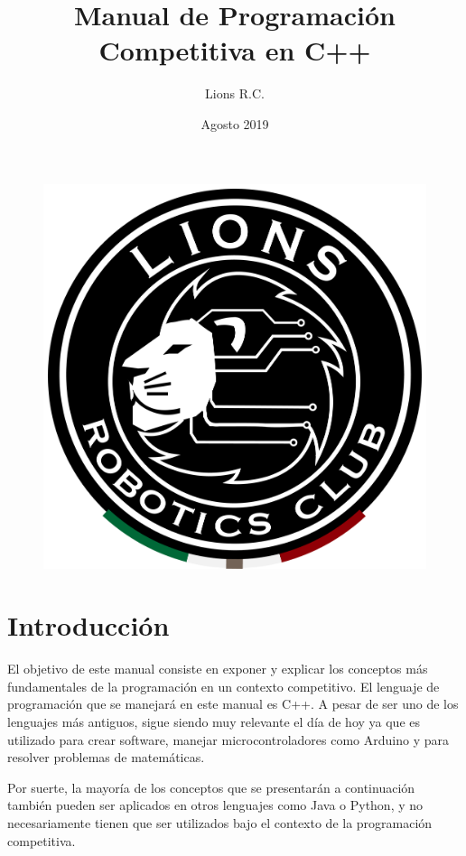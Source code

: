 \documentclass{article}
\title{Manual de Programación Competitiva en C++}
\author{Lions R.C.}
\date{Agosto 2019}
\begin{document}
\maketitle

\begin{figure}[H]
    \centering
    \includegraphics[width=0.2\paperwidth]{newblack}
\end{figure}

\tableofcontents

\section{Introducción}

El objetivo de este manual consiste en exponer y explicar los conceptos más fundamentales de la programación en un contexto competitivo. El lenguaje de programación que se manejará en este manual es C++. A pesar de ser uno de los lenguajes más antiguos, sigue siendo muy relevante el día de hoy ya que es utilizado para crear software, manejar microcontroladores como Arduino y para resolver problemas de matemáticas.

Por suerte, la mayoría de los conceptos que se presentarán a continuación también pueden ser aplicados en otros lenguajes como Java o Python, y no necesariamente tienen que ser utilizados bajo el contexto de la programación competitiva.
\end{document}
